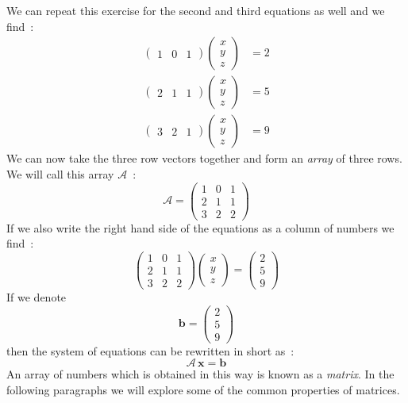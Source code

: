 We can repeat this exercise for the second and third equations as well and we find~:
\begin{align}
\begin{pmatrix}1 &0 &1\end{pmatrix}\begin{pmatrix}x\\ y\\ z\end{pmatrix}&=2\nonumber\\
\begin{pmatrix}2 &1 &1\end{pmatrix}\begin{pmatrix}x\\ y\\ z\end{pmatrix}&=5\\
\begin{pmatrix}3 &2 &1\end{pmatrix}\begin{pmatrix}x\\ y\\ z\end{pmatrix}&=9\nonumber
\end{align}
We can now take the three row vectors together and form an \textit{array} of three rows.
We will call this array $\mathcal{A}$~:
\begin{equation}
\mathcal{A}=\begin{pmatrix}1&0&1\\ 2&1&1\\ 3&2&2\end{pmatrix}
\end{equation}
If we also write the right hand side of the equations as a column of numbers we find~:
\begin{equation}
\begin{pmatrix}1&0&1\\ 2&1&1\\ 3&2&2\end{pmatrix}\begin{pmatrix}x\\ y\\ z\end{pmatrix}=\begin{pmatrix}2\\ 5\\ 9\end{pmatrix}
\end{equation}
If we denote 
\begin{equation}
\mathbf{b}=\begin{pmatrix}2\\ 5\\ 9\end{pmatrix}
\end{equation}
then the system of equations can be rewritten in short as~:
\begin{equation}
\mathcal{A}\,\mathbf{x}=\mathbf{b}
\end{equation}
An array of numbers which is obtained in this way is known as a \textit{matrix}.  
In the following paragraphs we will explore some of the common properties of matrices.

